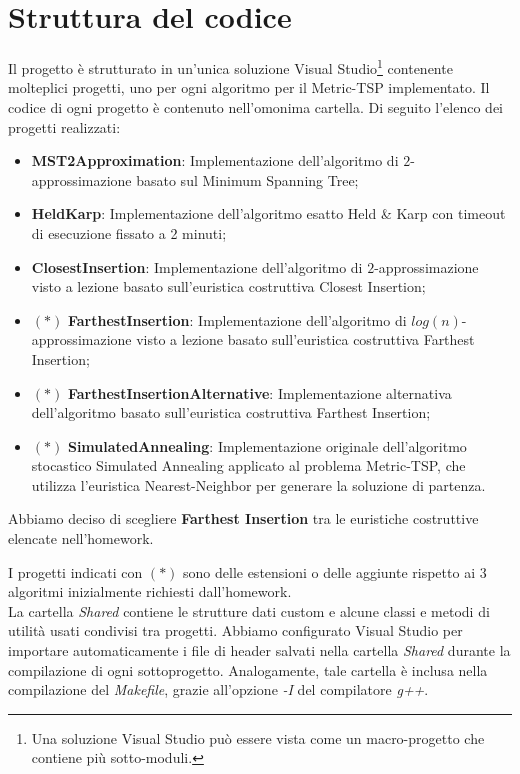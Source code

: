 \section{Struttura del codice}
\label{cap:code-structure}

Il progetto è strutturato in un'unica soluzione Visual Studio\footnote{Una soluzione Visual Studio può essere vista come un macro-progetto che contiene più sotto-moduli.} contenente molteplici progetti, uno per ogni algoritmo per il Metric-TSP implementato. Il codice di ogni progetto è contenuto nell'omonima cartella. Di seguito l'elenco dei progetti realizzati:

\begin{itemize}
    \item \textbf{MST2Approximation}: Implementazione dell'algoritmo di $2$-approssimazione basato sul Minimum Spanning Tree;
    \item \textbf{HeldKarp}: Implementazione dell'algoritmo esatto Held \& Karp con timeout di esecuzione fissato a 2 minuti;
    \item \textbf{ClosestInsertion}: Implementazione dell'algoritmo di $2$-approssimazione visto a lezione basato sull'euristica costruttiva Closest Insertion;
    \item $(*)$ \textbf{FarthestInsertion}: Implementazione dell'algoritmo di $log(n)$-approssimazione visto a lezione basato sull'euristica costruttiva Farthest Insertion;
    \item $(*)$ \textbf{FarthestInsertionAlternative}: Implementazione alternativa dell'algoritmo basato sull'euristica costruttiva Farthest Insertion;
    \item $(*)$ \textbf{SimulatedAnnealing}: Implementazione originale dell'algoritmo stocastico Simulated Annealing applicato al problema Metric-TSP, che utilizza l'euristica Nearest-Neighbor per generare la soluzione di partenza.
\end{itemize}

\noindent Abbiamo deciso di scegliere \textbf{Farthest Insertion} tra le euristiche costruttive elencate nell'homework.

\noindent I progetti indicati con $(*)$ sono delle estensioni o delle aggiunte rispetto ai 3 algoritmi inizialmente richiesti dall'homework.
\\

\noindent La cartella \textit{Shared} contiene le strutture dati custom e alcune classi e metodi di utilità usati
condivisi tra progetti. Abbiamo configurato Visual Studio per importare automaticamente i file di header salvati nella cartella \textit{Shared}
durante la compilazione di ogni sottoprogetto. Analogamente, tale cartella è inclusa nella compilazione del \textit{Makefile}, grazie all'opzione \textit{-I} del compilatore \textit{g++}.

